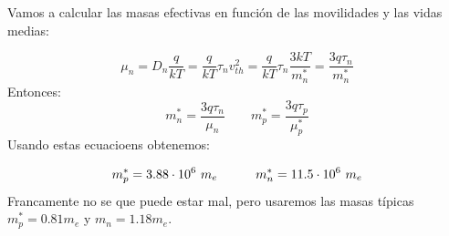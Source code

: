Vamos a calcular las masas efectivas en función de las movilidades y las vidas medias:

\begin{equation}
    \mu_n = D_n \frac{q}{kT} = \frac{q}{kT} \tau_n v^2_{th} = \frac{q}{kT} \tau_n \frac{3kT}{m_n^*} = \frac{3q\tau_n}{m_n^*}
\end{equation}
Entonces:
\begin{equation}
    m_n^* = \frac{3q\tau_n}{\mu_n} \qquad m_p^* = \frac{3q\tau_p}{\mu_p^*}
\end{equation}
Usando estas ecuacioens obtenemos:

\begin{equation}
    m_p^* = 3.88 \cdot 10^6 \ m_e \quad \quad \quad m_n^* = 11.5 \cdot 10^6 \ m_e
\end{equation}
Francamente no se que puede estar mal, pero usaremos las masas típicas $m_p^* = 0.81m_e$ y $m_n=1.18 m_e$. 
